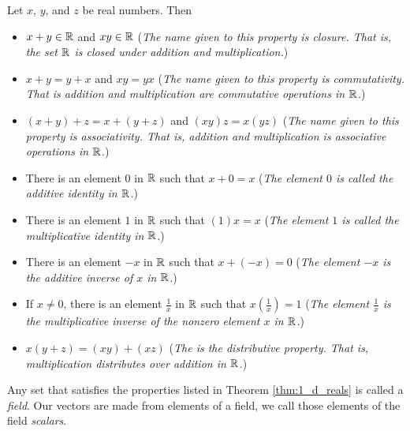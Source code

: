\begin{theorem} \label{thm:1_d_reals} Let $x$, $y$, and $z$ be real numbers. Then
\begin{itemize}
\item $x + y \in \mathbb{R}$ and $xy \in \mathbb{R}$ (\emph{The name given to this property is closure. That is, the set $\mathbb{R}$ is closed under addition and multiplication.})
\item $x + y = y + x$ and $xy=yx$ (\emph{The name given to this property is commutativity. That is addition and multiplication are commutative operations in $\mathbb{R}$.})
\item $(x + y) + z = x + (y + z)$ and $(xy)z = x(yz)$ (\emph{The name given to this property is associativity. That is, addition and multiplication is associative operations in $\mathbb{R}$.})
\item There is an element $0$ in $\mathbb{R}$ such that $x+ 0 = x$ (\emph{The element $0$ is called the  additive identity in $\mathbb{R}$.}) 
\item There is an element $1$ in $\mathbb{R}$ such that $(1)x = x$ (\emph{The element $1$ is called the  multiplicative identity in $\mathbb{R}$.}) 
\item There is an element $-x$ in $\mathbb{R}$ such that $x+(-x) = 0$ (\emph{The element $-x$ is the additive inverse of $x$ in $\mathbb{R}$.}) 
\item If $x \neq 0$, there is an element $\frac{1}{x}$ in $\mathbb{R}$ such that $x\left(\frac{1}{x}\right) = 1$ (\emph{The element $\frac{1}{x}$ is the multiplicative inverse of the nonzero element $x$ in $\mathbb{R}$.}) 
\item $x (y + z) = (x y) + (x z)$ (\emph{The is the distributive property. That is, multiplication distributes over addition in $\mathbb{R}$.}) 
\end{itemize}
\end{theorem}
Any set that satisfies the properties listed in Theorem  \ref{thm:1_d_reals} is called a \emph{field}. Our vectors are made from elements of a field, we call those elements of the field \emph{scalars}. 


